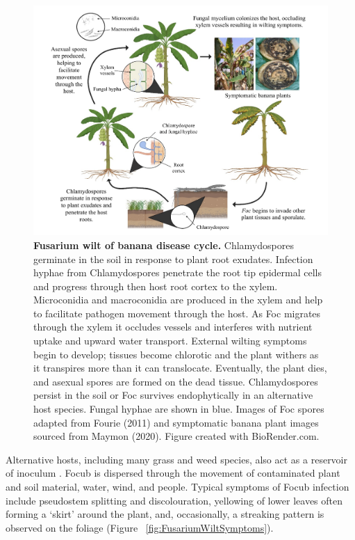 \newpage{}
\begin{figure}[p!]
    \includegraphics[width=16cm]{Figures/MyLifeCylceNarrow.pdf}
    \caption[Fusarium wilt of banana disease cycle.]{\textbf{Fusarium wilt of banana disease cycle.} Chlamydospores germinate in the soil in response to plant root exudates. Infection hyphae from Chlamydospores penetrate the root tip epidermal cells and progress through then host root cortex to the xylem. Microconidia and macroconidia are produced in the xylem and help to facilitate pathogen movement through the host. As Foc migrates through the xylem it occludes vessels and interferes with nutrient uptake and upward water transport. External wilting symptoms begin to develop; tissues become chlorotic and the plant withers as it transpires more than it can translocate. Eventually, the plant dies, and asexual spores are formed on the dead tissue. Chlamydospores persist in the soil or Foc survives endophytically in an alternative host species. Fungal hyphae are shown in blue. Images of Foc spores adapted from Fourie \et  (2011) and symptomatic banana plant images sourced from Maymon \et  (2020). Figure created with BioRender.com.}
    \label{fig:MyLifeCycle}
\end{figure}
\clearpage



Alternative hosts, including many grass and weed species, also act as a reservoir of inoculum \parencite{Hennessy2005}.  \ac{Focub} is dispersed through the movement of contaminated plant and soil material, water, wind, and people. Typical symptoms of \ac{Focub} infection include pseudostem splitting and discolouration, yellowing of lower leaves often forming a ‘skirt’ around the plant, and, occasionally, a streaking pattern is observed on the foliage (Figure ~\ref{fig:FusariumWiltSymptoms}). 

